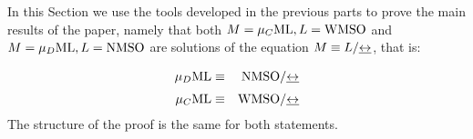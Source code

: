 
In this Section we use the tools developed in the previous parts to prove  the
main results of the paper, namely that both $M=\mu_{C}\mathrm{ML}, L=\mathrm{WMSO}$ and  $M=\mu_{D}\mathrm{ML},
L=\mathrm{NMSO}$ are  solutions of the equation $M \equiv L / {\mathrel{\underline{\leftrightarrow}}}$, that is:

\begin{eqnarray}
   \AFMC &\equiv& \nmso / {\bis} 
   \label{eq:z11}
\\[1mm] \mucML &\equiv& \wmso / {\bis} 
   \label{eq:z12}
\end{eqnarray}
The structure of the proof is the same for both statements. 


